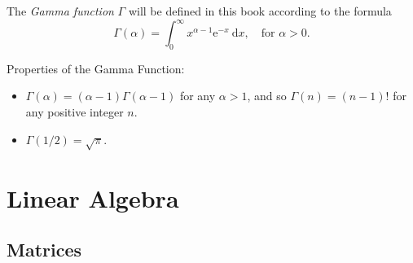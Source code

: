 \documentclass[captions=tableheading]{scrbook}
\begin{document}
The \emph{Gamma function} \(\Gamma\) will be defined in this book according to the formula
\begin{equation}
\Gamma(\alpha)=\int_{0}^{\infty}x^{\alpha-1}\mathrm{e}^{-x}\:\mathrm{d} x,\quad\mbox{for }\alpha > 0.
\end{equation}

\begin{fact}
Properties of the Gamma Function:
\begin{itemize}
\item \(\Gamma(\alpha)=(\alpha - 1)\Gamma(\alpha - 1)\) for any \(\alpha > 1\), and so \(\Gamma(n)=(n-1)!\) for any positive integer \(n\).
\item \(\Gamma(1/2)=\sqrt{\pi}\).
\end{itemize}

\end{fact}
\section{Linear Algebra \label{sec:Linear-Algebra}}
\label{sec-21-5}
\subsection{Matrices}
\label{sec-21-5-1}
\end{document}
